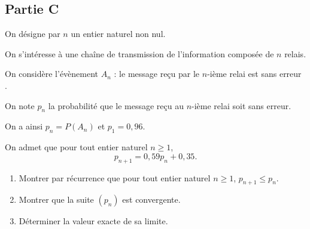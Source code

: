 \documentclass[10pt]{article}
\begin{document}
	\subsection*{Partie C}
		On désigne par $n$ un entier naturel non nul.

		On s'intéresse à une chaîne de transmission de l'information composée de $n$ relais.

		On considère l'évènement $A_{n}$ : \og le message reçu par le $n$-ième relai est sans erreur \fg{}.

		On note $p_{n}$ la probabilité que le message reçu au $n$-ième relai soit sans erreur.

		On a ainsi $p_{n}=P\left(A_{n}\right)$ et $p_{1}=0,96$.

		On admet que pour tout entier naturel $n \geqslant 1$,
		\[p_{n+1}=0,59 p_{n}+0,35.\]

		\begin{enumerate}
			\item Montrer par récurrence que pour tout entier naturel $n \geqslant 1$, \quad $p_{n+1} \leqslant p_{n}$.

			\item Montrer que la suite $(p_{n})$ est convergente.

			\item Déterminer la valeur exacte de sa limite.
		\end{enumerate}
\end{document}
